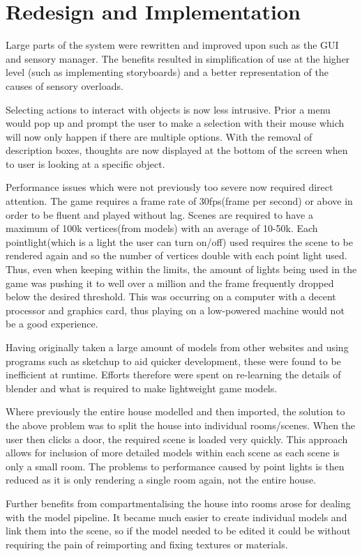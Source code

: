 \chapter{Redesign and Implementation}
Large parts of the system were rewritten and improved upon such as the GUI and sensory manager. The benefits resulted in simplification of use at the higher level (such as implementing storyboards) and a better representation of the causes of sensory overloads.

Selecting actions to interact with objects is now less intrusive. Prior a menu would pop up and prompt the user to make a selection with their mouse which will now only happen if there are multiple options. With the removal of description boxes, thoughts are now displayed at the bottom of the screen when to user is looking at a specific object.

Performance issues which were not previously too severe now required direct attention. The game requires a frame rate of 30fps(frame per second) or above in order to be fluent and played without lag. Scenes are required to have a maximum of 100k vertices(from models) with an average of 10-50k. Each pointlight(which is a light the user can turn on/off) used requires the scene to be rendered again and so the number of vertices double with each point light used. Thus, even when keeping within the limits, the amount of lights being used in the game was pushing it to well over a million and the frame frequently dropped below the desired threshold. This was occurring on a computer with a decent processor and graphics card, thus playing on a low-powered machine would not be a good experience.  

Having originally taken a large amount of models from other websites and using programs such as sketchup to aid quicker development, these were found to be inefficient at runtime. Efforts therefore were spent on re-learning the details of blender and what is required to make lightweight game models. 

Where previously the entire house modelled and then imported, the solution to the above problem was to split the house into individual rooms/scenes. When the user then clicks a door, the required scene is loaded very quickly. This approach allows for inclusion of more detailed models within each scene as each scene is only a small room. The problems to performance caused by point lights is then reduced as it is only rendering a single room again, not the entire house. 

Further benefits from compartmentalising the house into rooms arose for dealing with the model pipeline. It became much easier to create individual models and link them into the scene, so if the model needed to be edited it could be without requiring the pain of reimporting and fixing textures or materials. 

